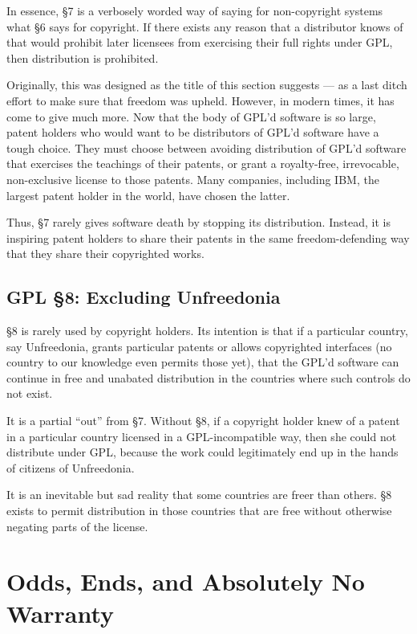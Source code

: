 \documentclass[11pt, letterpaper]{book}
\begin{document}
In essence, \S 7 is a verbosely worded way of saying for non-copyright
systems what \S 6 says for copyright. If there exists any reason that a
distributor knows of that would prohibit later licensees from exercising
their full rights under GPL, then distribution is prohibited.

Originally, this was designed as the title of this section suggests --- as
a last ditch effort to make sure that freedom was upheld. However, in
modern times, it has come to give much more. Now that the body of GPL'd
software is so large, patent holders who would want to be distributors of
GPL'd software have a tough choice. They must choose between avoiding
distribution of GPL'd software that exercises the teachings of their
patents, or grant a royalty-free, irrevocable, non-exclusive license to
those patents. Many companies, including IBM, the largest patent holder
in the world, have chosen the latter.

Thus, \S 7 rarely gives software death by stopping its distribution.
Instead, it is inspiring patent holders to share their patents in the same
freedom-defending way that they share their copyrighted works.

\section{GPL \S 8: Excluding Unfreedonia}
\label{GPLs8}

\S 8 is rarely used by copyright holders. Its intention is that if a
particular country, say Unfreedonia, grants particular patents or allows
copyrighted interfaces (no country to our knowledge even permits those
yet), that the GPL'd software can continue in free and unabated
distribution in the countries where such controls do not exist.

It is a partial ``out'' from \S 7. Without \S 8, if a copyright holder
knew of a patent in a particular country licensed in a GPL-incompatible
way, then she could not distribute under GPL, because the work could
legitimately end up in the hands of citizens of Unfreedonia.

It is an inevitable but sad reality that some countries are freer than
others. \S 8 exists to permit distribution in those countries that are
free without otherwise negating parts of the license.

\chapter{Odds, Ends, and Absolutely No Warranty}
\end{document}

